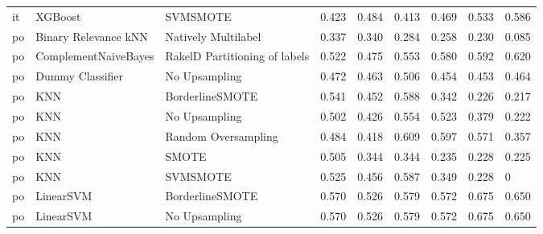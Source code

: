 \begin{tabular}{lllllllll}
      it &                         XGBoost &                      SVMSMOTE & 0.423 &                     0.484 &                 0.413 &                  0.469 &                                   0.533 &     0.586 \\
      po &            Binary Relevance kNN &           Natively Multilabel & 0.337 &                     0.340 &                 0.284 &                  0.258 &                                   0.230 &     0.085 \\
      po &            ComplementNaiveBayes & RakelD Partitioning of labels & 0.522 &                     0.475 &                 0.553 &                  0.580 &                                   0.592 &     0.620 \\
      po &                Dummy Classifier &                 No Upsampling & 0.472 &                     0.463 &                 0.506 &                  0.454 &                                   0.453 &     0.464 \\
      po &                             KNN &               BorderlineSMOTE & 0.541 &                     0.452 &                 0.588 &                  0.342 &                                   0.226 &     0.217 \\
      po &                             KNN &                 No Upsampling & 0.502 &                     0.426 &                 0.554 &                  0.523 &                                   0.379 &     0.222 \\
      po &                             KNN &           Random Oversampling & 0.484 &                     0.418 &                 0.609 &                  0.597 &                                   0.571 &     0.357 \\
      po &                             KNN &                         SMOTE & 0.505 &                     0.344 &                 0.344 &                  0.235 &                                   0.228 &     0.225 \\
      po &                             KNN &                      SVMSMOTE & 0.525 &                     0.456 &                 0.587 &                  0.349 &                                   0.228 &         0 \\
      po &                       LinearSVM &               BorderlineSMOTE & 0.570 &                     0.526 &                 0.579 &                  0.572 &                                   0.675 &     0.650 \\
      po &                       LinearSVM &                 No Upsampling & 0.570 &                     0.526 &                 0.579 &                  0.572 &                                   0.675 &     0.650 \\

\end{tabular}
